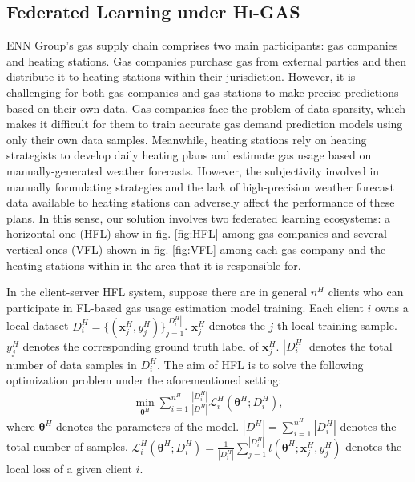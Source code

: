 \documentclass{article}
\newcommand{\methodname}{\textsc{Hi-GAS}}
\begin{document}
\subsection{Federated Learning under \methodname{}}
ENN Group's gas supply chain comprises two main participants: gas companies and heating stations. Gas companies purchase gas from external parties and then distribute it to heating stations within their jurisdiction. 
However, it is challenging for both gas companies and gas stations to make precise predictions based on their own data. Gas companies face the problem of data sparsity, which makes it difficult for them to train accurate gas demand prediction models using only their own data samples. Meanwhile, heating stations rely on heating strategists to develop daily heating plans and estimate gas usage based on manually-generated weather forecasts. However, the subjectivity involved in manually formulating strategies and the lack of high-precision weather forecast data available to heating stations can adversely affect the performance of these plans.
In this sense, our solution involves two federated learning ecosystems: a horizontal one (HFL) show in fig. \ref{fig:HFL} among gas companies and several vertical ones (VFL) shown in fig. \ref{fig:VFL} among each gas company and the heating stations within in the area that it is responsible for. 

In the client-server HFL system, suppose there are in general $n^H$ clients who can participate in FL-based gas usage estimation model training. Each client $i$ owns a local dataset $D_i^H =\{(\mathbf{x}^H_j, y^H_j)\}_{j=1}^{|D^H_i|}$. $\mathbf{x}^H_j$ denotes the $j$-th local training sample. $y^H_j$ denotes the corresponding ground truth label of $\mathbf{x}^H_j$. $|D^H_i|$ denotes the total number of data samples in $D^H_i$. The aim of HFL is to solve the following optimization problem under the aforementioned setting:
\begin{equation}
\label{eq:hfl_goal}
\begin{aligned}
\min_{\mathbf{\theta}^H}\sum_{i=1}^{n^H} \frac{|D^H_i|}{|D^H|} \mathcal{L}_i^H(\mathbf{\theta}^H;D^H_i),
\end{aligned}
\end{equation}
where $\mathbf{\theta}^H$ denotes the parameters of the model. $|D^H| = \sum_{i =1}^{n^H} |D^H_i|$ denotes the total number of samples. $\mathcal{L}_i^H(\mathbf{\theta}^H;D^H_i) = \frac{1}{|D^H_i|} \sum_{j=1}^{|D^H_i|}l(\mathbf{\theta}^H;\mathbf{x}^H_j, y^H_j)$ denotes the local loss of a given client $i$.
\end{document}
